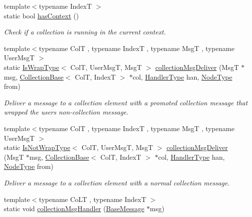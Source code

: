 \begin{DoxyCompactItemize}
{\footnotesize template$<$typename IndexT $>$ }\\static bool \hyperlink{structvt_1_1vrt_1_1collection_1_1_collection_manager_ad94808d98e429e50376a9d1b35de57ee}{has\+Context} ()
\begin{DoxyCompactList}\small\item\em Check if a collection is running in the current context. \end{DoxyCompactList}\item 
{\footnotesize template$<$typename ColT , typename IndexT , typename MsgT , typename User\+MsgT $>$ }\\static \hyperlink{structvt_1_1vrt_1_1collection_1_1_collection_manager_a1f91c97ed52237c3a3576dfbbe87c8f8}{Is\+Wrap\+Type}$<$ ColT, User\+MsgT, MsgT $>$ \hyperlink{structvt_1_1vrt_1_1collection_1_1_collection_manager_aeefbfe1468c9583c4ffb730b6fbdd263}{collection\+Msg\+Deliver} (MsgT $\ast$msg, \hyperlink{structvt_1_1vrt_1_1collection_1_1_collection_base}{Collection\+Base}$<$ ColT, IndexT $>$ $\ast$col, \hyperlink{namespacevt_af64846b57dfcaf104da3ef6967917573}{Handler\+Type} han, \hyperlink{namespacevt_a866da9d0efc19c0a1ce79e9e492f47e2}{Node\+Type} from)
\begin{DoxyCompactList}\small\item\em Deliver a message to a collection element with a promoted collection message that wrapped the user\textquotesingle{}s non-\/collection message. \end{DoxyCompactList}\item 
{\footnotesize template$<$typename ColT , typename IndexT , typename MsgT , typename User\+MsgT $>$ }\\static \hyperlink{structvt_1_1vrt_1_1collection_1_1_collection_manager_a18e3a17d9eb086c6c2f499242b7faa1e}{Is\+Not\+Wrap\+Type}$<$ ColT, User\+MsgT, MsgT $>$ \hyperlink{structvt_1_1vrt_1_1collection_1_1_collection_manager_a2c5223b9c6bf628b8e00e8f95fc6d0bc}{collection\+Msg\+Deliver} (MsgT $\ast$msg, \hyperlink{structvt_1_1vrt_1_1collection_1_1_collection_base}{Collection\+Base}$<$ ColT, IndexT $>$ $\ast$col, \hyperlink{namespacevt_af64846b57dfcaf104da3ef6967917573}{Handler\+Type} han, \hyperlink{namespacevt_a866da9d0efc19c0a1ce79e9e492f47e2}{Node\+Type} from)
\begin{DoxyCompactList}\small\item\em Deliver a message to a collection element with a normal collection message. \end{DoxyCompactList}\item 
{\footnotesize template$<$typename Co\+LT , typename IndexT $>$ }\\static void \hyperlink{structvt_1_1vrt_1_1collection_1_1_collection_manager_a9b2bfe1f74298f0e9b7fdc4888f73e3d}{collection\+Msg\+Handler} (\hyperlink{namespacevt_ac34f95a5e2b8109b55bfba52b074443d}{Base\+Message} $\ast$msg)

\end{DoxyCompactItemize}
